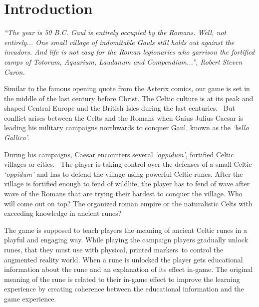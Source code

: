 \section{Introduction}
\label{sec:introduction}

\textit{``The year is 50 B.C. Gaul is entirely occupied by the Romans. Well, not entirely... One small village of indomitable Gauls still holds out against the invadors. And life is not easy for the Roman legionaries who garrison the fortified camps of Totorum, Aquarium, Laudanum and Compendium...'', Robert Steven Caron.}~\cite{asterix-beginning}

Similar to the famous opening quote from the Asterix comics, our game is set in the middle of the last century before Christ. The Celtic culture is at its peak and shaped Central Europe and the British Isles during the last centuries.~\cite{celtic-expansion} But conflict arises between the Celts and the Romans when Gaius Julius Caesar is leading his military campaigns northwards to conquer Gaul, known as the \textit{`bello Gallico'}.\footnotemark
{}

During his campaigns, Caesar encounters several \textit{`oppidum'}, fortified Celtic villages or cities.~\cite{collis-oppidum} The player is taking control over the defenses of a small Celtic \textit{`oppidum'} and has to defend the village using powerful Celtic runes. After the village is fortified enough to fend of wildlife, the player has to fend of wave after wave of the Romans that are trying their hardest to conquer the village. Who will come out on top? The organized roman empire or the naturalistic Celts with exceeding knowledge in ancient runes?

The game is supposed to teach players the meaning of ancient Celtic runes in a playful and engaging way. While playing the campaign players gradually unlock runes, that they must use with physical, printed markers\footnotemark \ to control the augmented reality world.
When a rune is unlocked the player gets educational information about the rune and an explanation of its effect in-game. The original meaning of the rune is related to their in-game effect to improve the learning experience by creating coherence between the educational information and the game experience.

